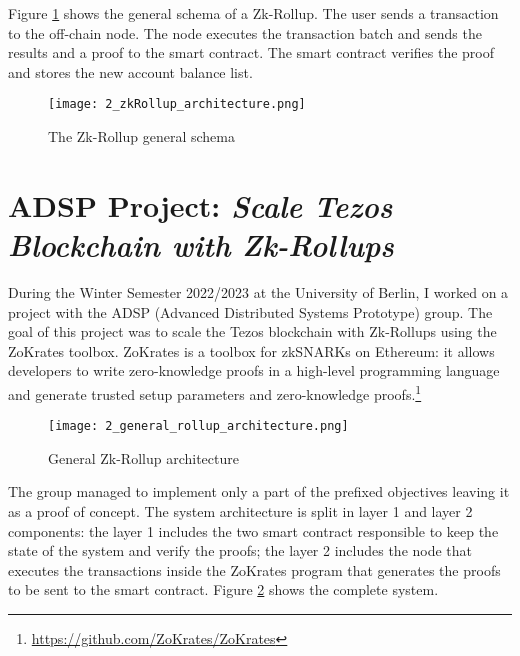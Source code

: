 Figure \ref{fig:2_zkRollup_schema} shows the general schema of a Zk-Rollup. The user sends a transaction to the off-chain node. The node executes the transaction batch and sends the results and a proof to the smart contract. The smart contract verifies the proof and stores the new account balance list.

\begin{figure}[ht]
  \centering
  \texttt{[image: 2\_zkRollup\_architecture.png]}
  \caption[Zk-Rollup schema]{The Zk-Rollup general schema \cite{noauthor_material_nodate}}  
  \label{fig:2_zkRollup_schema}
\end{figure}

\section{ADSP Project: \textit{Scale Tezos Blockchain with Zk-Rollups}}
During the Winter Semester 2022/2023 at the University of Berlin, I worked on a project with the ADSP (Advanced Distributed Systems Prototype) group. The goal of this project was to scale the Tezos blockchain with Zk-Rollups using the ZoKrates toolbox. ZoKrates is a toolbox for zkSNARKs on Ethereum: it allows developers to write zero-knowledge proofs in a high-level programming language and generate trusted setup parameters and zero-knowledge proofs.\footnote{\url{https://github.com/ZoKrates/ZoKrates}}

\begin{figure}[ht]
  \centering
  \texttt{[image: 2\_general\_rollup\_architecture.png]}
  \caption[Zk-Rollup architecture]{General Zk-Rollup architecture}  
  \label{fig:2_general_rollup_architecture}
\end{figure}

The group managed to implement only a part of the prefixed objectives leaving it as a proof of concept. The system architecture is split in layer 1 and layer 2 components: the layer 1 includes the two smart contract responsible to keep the state of the system and verify the proofs; the layer 2 includes the node that executes the transactions inside the ZoKrates program that generates the proofs to be sent to the smart contract. Figure \ref{fig:2_general_rollup_architecture} shows the complete system.


